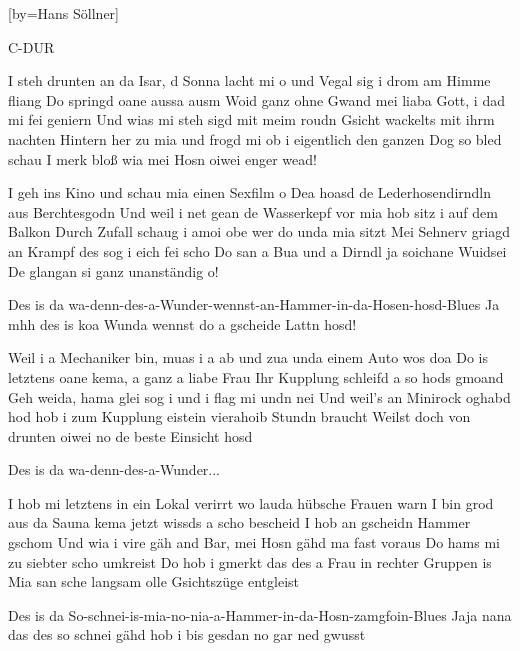 
[by={Hans Söllner}]

\chordson

\beginverse
\nolyrics C-DUR
\endverse

\beginverse
I steh drunten an da Isar, d Sonna lacht mi o
und Vegal sig i drom am Himme fliang
Do springd oane aussa ausm Woid ganz ohne Gwand
mei liaba Gott, i dad mi fei geniern
Und wias mi steh sigd mit meim roudn Gsicht
wackelts mit ihrm nachten Hintern her zu mia
und frogd mi ob i eigentlich den ganzen Dog so bled schau
I merk bloß wia mei Hosn oiwei enger wead!
\endverse

\beginverse
I geh ins Kino und schau mia einen Sexfilm o
Dea hoasd de Lederhosendirndln aus Berchtesgodn
Und weil i net gean de Wasserkepf vor mia hob sitz i auf dem Balkon
Durch Zufall schaug i amoi obe wer do unda mia sitzt
Mei Sehnerv griagd an Krampf des sog i eich fei scho
Do san a Bua und a Dirndl ja soichane Wuidsei
De glangan si ganz unanständig o!
\endverse


\beginchorus
Des is da wa-denn-des-a-Wunder-wennst-an-Hammer-in-da-Hosen-hosd-Blues
Ja mhh des is koa Wunda wennst do a gscheide Lattn hosd!
\endchorus

\beginverse
Weil i a Mechaniker bin, muas i a ab und zua unda einem Auto wos doa
Do is letztens oane kema, a ganz a liabe Frau
Ihr Kupplung schleifd a so hods gmoand
Geh weida, hama glei sog i und i flag mi undn nei
Und weil’s an Minirock oghabd hod
hob i zum Kupplung eistein vierahoib Stundn braucht
Weilst doch von drunten oiwei no de beste Einsicht hosd
\endverse


\beginchorus
Des is da wa-denn-des-a-Wunder...
\endchorus

\beginverse
I hob mi letztens in ein Lokal verirrt wo lauda hübsche Frauen warn
I bin grod aus da Sauna kema jetzt wissds a scho bescheid
I hob an gscheidn Hammer gschom
Und wia i vire gäh and Bar, mei Hosn gähd ma fast voraus
Do hams mi zu siebter scho umkreist
Do hob i gmerkt das des a Frau in rechter Gruppen is
Mia san sche langsam olle Gsichtszüge entgleist
\endverse

\beginchorus
Des is da So-schnei-is-mia-no-nia-a-Hammer-in-da-Hosn-zamgfoin-Blues
Jaja nana das des so schnei gähd hob i bis gesdan no gar ned gwusst
\endchorus

\endsong